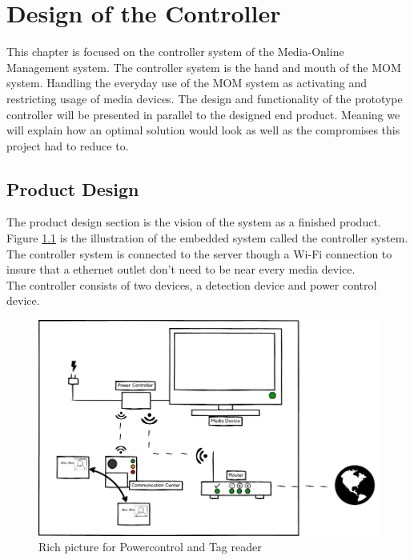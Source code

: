 \chapter{Design of the Controller}
\label{chap:controller}
This chapter is focused on the controller system of the Media-Online Management system. The controller system is the hand and mouth of the MOM system. Handling the everyday use of the MOM system as activating and restricting usage of media devices.\newline
The design and functionality of the prototype controller will be presented in parallel to the designed end product. Meaning we will explain how an optimal solution would look as well as the compromises this project had to reduce to.\newline

\section{Product Design}

The product design section is the vision of the system as a finished product. Figure \ref{fig:Power&Tagdevice} is the illustration of the embedded system called the controller system. The controller system is connected to the server though a Wi-Fi connection to insure that a ethernet outlet don't need to be near every media device. \\ 
The controller consists of two devices, a detection device and power control device.

\begin{figure}[h]
	\centering
		\includegraphics[width=1.00\textwidth]{images/Power&Tagdevice.png}
	\caption{Rich picture for Powercontrol and Tag reader}
	\label{fig:Power&Tagdevice}
\end{figure}

